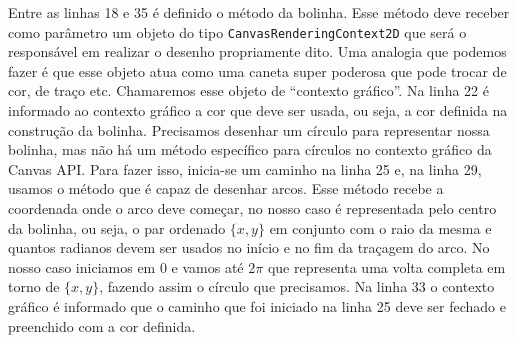 Entre as linhas 18 e 35 é definido o método  da bolinha. Esse método deve receber como parâmetro um objeto do tipo \texttt{CanvasRenderingContext2D} que será o responsável em realizar o desenho propriamente dito. Uma analogia que podemos fazer é que esse objeto atua como uma caneta super poderosa que pode trocar de cor, de traço etc. Chamaremos esse objeto de ``contexto gráfico''. Na linha 22 é informado ao contexto gráfico a cor que deve ser usada, ou seja, a cor definida na construção da bolinha. Precisamos desenhar um círculo para representar nossa bolinha, mas não há um método específico para círculos no contexto gráfico da Canvas API. Para fazer isso, inicia-se um caminho na linha 25 e, na linha 29, usamos o método  que é capaz de desenhar arcos. Esse método recebe a coordenada onde o arco deve começar, no nosso caso é representada pelo centro da bolinha, ou seja, o par ordenado $\{x, y\}$ em conjunto com o raio da mesma e quantos radianos devem ser usados no início e no fim da traçagem do arco. No nosso caso iniciamos em $0$ e vamos até $2\pi$ que representa uma volta completa em torno de $\{x, y\}$, fazendo assim o círculo que precisamos. Na linha 33 o contexto gráfico é informado que o caminho que foi iniciado na linha 25 deve ser fechado e preenchido com a cor definida.

